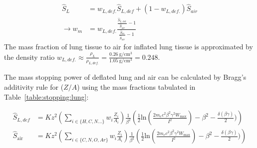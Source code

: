 \documentclass{article}
\begin{document}
\begin{align}
    \hat{S}_L &= w_{L, def.} \hat{S}_{L, def}+(1-w_{L, def.})\hat{S}_{air}\\
    \rightarrow{}w_m &= w_{L, def.} \frac{\frac{\hat{S}_{L,\text{def.}}}{\hat{S}_{air}}-1}{\frac{\hat{S}_m}{\hat{S}_{air}}-1}
\end{align}
The mass fraction of lung tissue to air for inflated lung tissue is approximated by the density ratio $w_{L, def.} \approx \frac{\rho_L}{\rho_{{L, def.}}} = \frac{\SI{0.26}{\gram\per\centi\meter\cubed}}{\SI{1.05}{\gram\per\centi\meter\cubed}} = 0.248$.

The mass stopping power of deflated lung and air can be calculated by Bragg's additivity rule for ($Z/A$) using the mass fractions tabulated in Table~\ref{table:stopping:lung}:

\begin{align}
    \hat{S}_{L, def} &= Kz^2 \left(\sum_{i \in \{H, C, N ...\}} w_i\frac{Z_i}{A_i}\right) \frac{1}{\beta^2}\left(\frac{1}{2}\text{ln}\left(\frac{2m_ec^2\beta^2\gamma^2W_{\text{max}}}{I^2}\right)-\beta^2-\frac{\delta (\beta\gamma)}{2}) \right)\\
    \hat{S}_{\text{air}} &= Kz^2 \left(\sum_{i \in \{C, N, O, Ar\}} w_i\frac{Z_i}{A_i}\right) \frac{1}{\beta^2}\left(\frac{1}{2}\text{ln}\left(\frac{2m_ec^2\beta^2\gamma^2W_{\text{max}}}{I^2}\right)-\beta^2-\frac{\delta (\beta\gamma)}{2}) \right)
\end{align}
\end{document}
